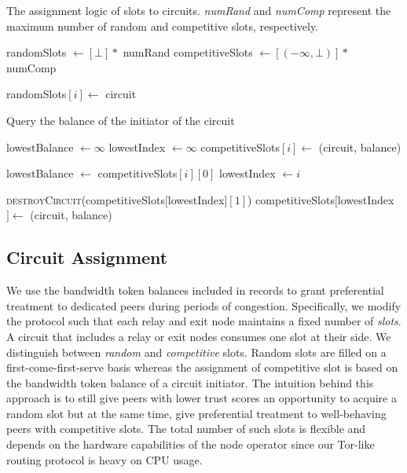 \begin{algorithm}[!t]
	\caption{The assignment logic of slots to circuits. \emph{numRand} and \emph{numComp} represent the maximum number of random and competitive slots, respectively.}
	\label{alg:slot_logic}
	\begin{algorithmic}[1]
		\State randomSlots $ \leftarrow [\bot] * $ numRand
		\State competitiveSlots $ \leftarrow [(-\infty, \bot)] * $ numComp
		\State
		
		\State randomSlots$[i] \leftarrow $ circuit
		\State \Return
		\EndIf
		\EndFor
		
		\State Query the balance of the initiator of the circuit
		
		\EndFunction
		\State
		
		\State lowestBalance $ \leftarrow \infty $
		\State lowestIndex $ \leftarrow \infty $
		\State competitiveSlots$[i] \leftarrow $ (circuit, balance)
		\State \Return
		\EndIf
		
		\State lowestBalance $ \leftarrow $ competitiveSlots$[i][0] $
		\State lowestIndex $ \leftarrow i $
		\EndIf
		\EndFor
		
		\State \textsc{destroyCircuit}(competitiveSlots$[$lowestIndex$][1] $)
		\State competitiveSlots$[$lowestIndex$] \leftarrow $ (circuit, balance)
		\EndIf
		
		\EndFunction
		
	\end{algorithmic}
\end{algorithm}

\subsection{Circuit Assignment}
We use the bandwidth token balances included in \TrustChain{} records to grant preferential treatment to dedicated peers during periods of congestion.
Specifically, we modify the \Tribler{} protocol such that each relay and exit node maintains a fixed number of \emph{slots}.
A circuit that includes a relay or exit nodes consumes one slot at their side.
We distinguish between \emph{random} and \emph{competitive} slots.
Random slots are filled on a first-come-first-serve basis whereas the assignment of competitive slot is based on the bandwidth token balance of a circuit initiator.
The intuition behind this approach is to still give peers with lower trust scores an opportunity to acquire a random slot but at the same time, give preferential treatment to well-behaving peers with competitive slots.
The total number of such slots is flexible and depends on the hardware capabilities of the node operator since our Tor-like routing protocol is heavy on CPU usage.

